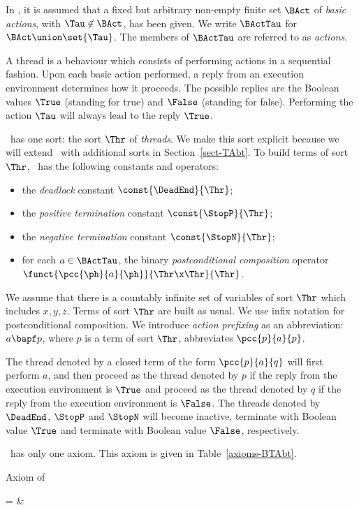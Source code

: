 \documentclass[fleqn]{llncs}
\begin{document}
In \BTAbt, it is assumed that a fixed but arbitrary non-empty finite set
$\BAct$ of \emph{basic actions}, with $\Tau \not\in \BAct$, has been
given.
We write $\BActTau$ for $\BAct \union \set{\Tau}$.
The members of $\BActTau$ are referred to as \emph{actions}.

A thread is a behaviour which consists of performing actions in a
sequential fashion.
Upon each basic action performed, a reply from an execution environment
determines how it proceeds.
The possible replies are the Boolean values $\True$ (standing for true)
and $\False$ (standing for false).
Performing the action $\Tau$ will always lead to the reply $\True$.

\BTAbt\ has one sort: the sort $\Thr$ of \emph{threads}.
We make this sort explicit because we will extend \BTAbt\ with
additional sorts in Section~\ref{sect-TAbt}.
To build terms of sort $\Thr$, \BTAbt\ has the following constants and
operators:
\begin{itemize}
\item
the \emph{deadlock} constant $\const{\DeadEnd}{\Thr}$;
\item
the \emph{positive termination} constant $\const{\StopP}{\Thr}$;
\item
the \emph{negative termination} constant $\const{\StopN}{\Thr}$;
\item
for each $a \in \BActTau$, the binary \emph{postconditional composition}
operator $\funct{\pcc{\ph}{a}{\ph}}{\linebreak[2]\Thr \x \Thr}{\Thr}$.
\end{itemize}
We assume that there is a countably infinite set of variables of sort
$\Thr$ which includes $x,y,z$.
Terms of sort $\Thr$ are built as usual.
We use infix notation for postconditional composition.
We introduce \emph{action prefixing} as an abbreviation: $a \bapf p$,
where $p$ is a term of sort $\Thr$, abbreviates $\pcc{p}{a}{p}$.

The thread denoted by a closed term of the form $\pcc{p}{a}{q}$ will
first perform $a$, and then proceed as the thread denoted by $p$
if the reply from the execution environment is $\True$ and proceed as
the thread denoted by $q$ if the reply from the execution environment is
$\False$.
The threads denoted by $\DeadEnd$, $\StopP$ and $\StopN$ will become
inactive, terminate with Boolean value $\True$ and terminate with
Boolean value $\False$, respectively.

\BTAbt\ has only one axiom.
This axiom is given in Table~\ref{axioms-BTAbt}.\begin{table}[!tb]
\caption{Axiom of \BTAbt}
\label{axioms-BTAbt}
\begin{eqntbl}
\begin{axcol}
 =                      & 
\end{axcol}
\end{eqntbl}
\end{table}
\end{document}
